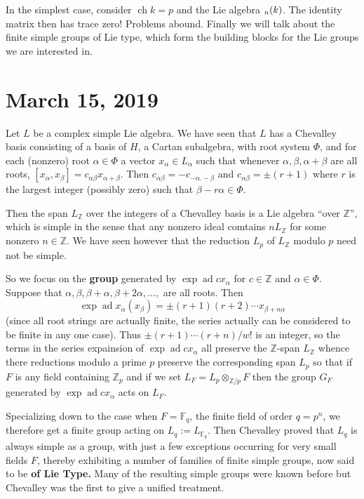 \documentclass[12pt]{article}
\theoremstyle{nonumberbreak}
\theoremstyle{changebreak}
\theoremstyle{nonumberbreak}
\theoremstyle{change}
\newcommand*{\Z}{
\mathbb{Z}
}
\DeclareMathOperator{\ch}{ch}
\let\sl\relax
\DeclareMathOperator{\sl}{\mathfrak{sl}}
\DeclareMathOperator{\ad}{ad}
\begin{document}
In the simplest case, consider $\ch k=p$ and the Lie algebra $\sl_n(k)$. The identity matrix
then has trace zero! Problems abound. Finally we will talk about the finite simple groups of Lie type,
which form the building blocks for the Lie groups we are interested in.

\section{March 15, 2019}
Let $L$ be a complex simple Lie algebra. We have seen that $L$ has a Chevalley basis
consisting of a basis of $H$, a Cartan subalgebra, with root system $\Phi$, and for each
(nonzero) root $\alpha\in\Phi$ a vector $x_\alpha\in L_\alpha$ such that whenever $\alpha,\beta,\alpha+\beta$
are all roots, $[x_\alpha,x_\beta]=c_{\alpha\beta}x_{\alpha+\beta}$. Then $c_{\alpha\beta}=-c_{-\alpha.-\beta}$
and $c_{\alpha\beta}=\pm(r+1)$ where $r$ is the largest integer (possibly zero) such that $\beta-r\alpha\in\Phi$.

Then the span $L_\Z$ over the integers of a Chevalley basis is a Lie algebra ``over $\Z$'', which is 
simple in the sense that any nonzero ideal comtains $nL_\Z$ for some nonzero $n\in\Z$. We have seen however that
the reduction $L_p$ of $L_\Z$ modulo $p$ need not be simple.

So we focus on the \textbf{group} generated by $\exp\ad cx_\alpha$ for $c\in\Z$ and $\alpha\in\Phi$.
Suppose that $\alpha,\beta,\beta+\alpha,\beta+2\alpha,\dots,$ are all roots. Then
\[\exp\ad x_\alpha(x_\beta)=\pm(r+1)(r+2)\cdots x_{\beta+n\alpha}\]
(since all root strings are actually finite, the series actually can be considered to be
finite in any one case). Thus $\pm(r+1)\cdots(r+n)/w!$ is an integer, so the terms in the series
expainsion of $\exp\ad cx_\alpha$ all preserve the $\Z$-span $L_\Z$ whence there reductions modulo
a prime $p$ preserve the corresponding span $L_p$ so that if $F$ is any field containing $\Z_p$
and if we set $L_F=L_p\otimes_{\Z/p}F$ then the group $G_F$ generated by $\exp\ad cx_\alpha$ acts on $L_F$.

Specializing down to the case when $F=\mathbb{F}_q$, the finite field of order $q=p^n$,
we therefore get a finite group acting on $L_q:=L_{\mathbb{F}_q}$. Then Chevalley proved that $L_q$ is always simple as a group, 
with just a few exceptions occurring for very small fields $F$, thereby exhibiting a number 
of families of finite simple groups, now said to be \textbf{of Lie Type.} Many of the resulting simple groups were known
before but Chevalley was the first to give a unified treatment.
\end{document}
